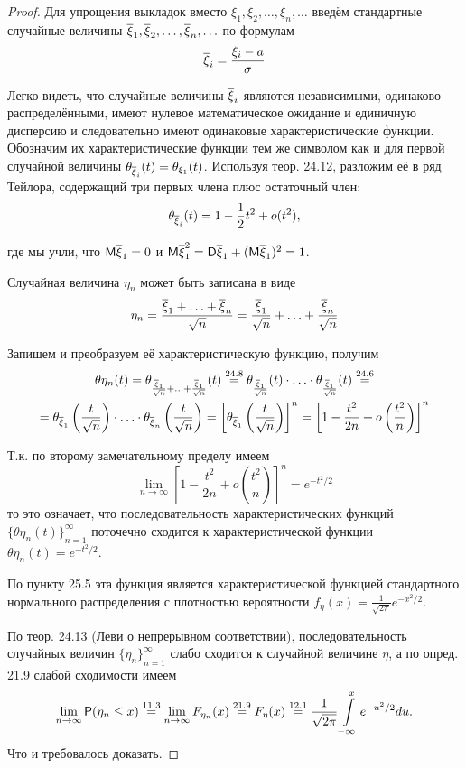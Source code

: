\begin{proof}
Для упрощения выкладок вместо $\xi_1 , \xi_2 , \ldots , \xi_n , \ldots$
введём стандартные случайные величины $\oxi_1 , \oxi_2 , \ldots , \oxi_n , \ldots$ по формулам
$$
\oxi_i=\frac{\xi_i-a}{\sigma}
$$

Легко видеть, что случайные величины $\oxi_i$ являются независимыми, одинаково распределёнными, имеют нулевое математическое ожидание и единичную дисперсию и следовательно имеют одинаковые характеристические функции. Обозначим их характеристические функции тем же символом как и для первой случайной величины $\theta_{\oxi_i}(t) = \theta_{\xi_1} (t)$. Используя теор. 24.12, разложим её в ряд Тейлора, содержащий три первых члена плюс остаточный член:
$$
\theta_{\oxi_i}(t)=1-\frac{1}{2}t^2+o(t^2),
$$

где мы учли, что $\M\oxi_1 = 0$ и $\M\oxi_1^2 = \D\oxi_1 + (\M\oxi_1)^2 = 1$.

Случайная величина $\eta_n$ может быть записана в виде
$$\eta_n =\frac{\oxi_1+\ldots+\oxi_n}{\sqrt{n}}=
\frac{\oxi_1}{\sqrt{n}}+\ldots+\frac{\oxi_n}{\sqrt{n}}
$$

Запишем и преобразуем её характеристическую функцию, получим
\begin{gather*}
\theta\eta_n (t) = \theta_{\frac{\oxi_1}{\sqrt{n}} + \ldots + \frac{\oxi_1}{\sqrt{n}}}(t)
\stackrel{24.8}{=}
\theta_{\frac{\oxi_1}{\sqrt{n}}}(t)\cdot\ldots\cdot \theta_{\frac{\oxi_1}{\sqrt{n}}}(t)
\stackrel{24.6}{=}\\=
\theta_{\oxi_1}\left(\frac{t}{\sqrt{n}}\right)
	\cdot\ldots\cdot
\theta_{\oxi_n}\left(\frac{t}{\sqrt{n}}\right)=
\left[
	\theta_{\oxi_1}\left(\frac{t}{\sqrt{n}}\right)
\right]^n=
\left[
	1-\frac{t^2}{2n}+o\left(\frac{t^2}{n}\right)
\right]^n
\end{gather*}

Т.к. по второму замечательному пределу имеем
$$
\lim\limits_{n\to\infty}
\left[
	1-\frac{t^2}{2n}+o\left(\frac{t^2}{n}\right)
\right]^n=e^{-t^2/2}
$$
то это означает, что последовательность характеристических функций
${\{\theta\eta_n (t)\}}_{n=1}^\infty$ поточечно сходится к характеристической функции 
${\theta\eta_n (t)}=e^{-t^2/2}$.

По пункту 25.5 эта функция является характеристической функцией стандартного нормального распределения с плотностью вероятности
$f_\eta (x) = \frac{1}{\sqrt{2\pi}}e^{-x^2/2}$. 

По теор. 24.13 (Леви о непрерывном соответствии), последовательность случайных величин ${\{\eta_n \}}^\infty_{n=1}$ слабо сходится к случайной
величине $\eta$, а по опред. 21.9 слабой сходимости имеем
\begin{gather*}
\lim\limits_{n\to\infty} \P(\eta_n \leq x)
\stackrel{11.3}{=}
\lim\limits_{n\to\infty} F_{\eta_n}(x)
\stackrel{21.9}{=}
F_\eta(x)
\stackrel{12.1}{=}
\frac{1}{\sqrt{2\pi}}\int\limits_{-\infty}^x e^{-u^2/2} du.
\end{gather*}
Что и требовалось доказать.
\end{proof}

